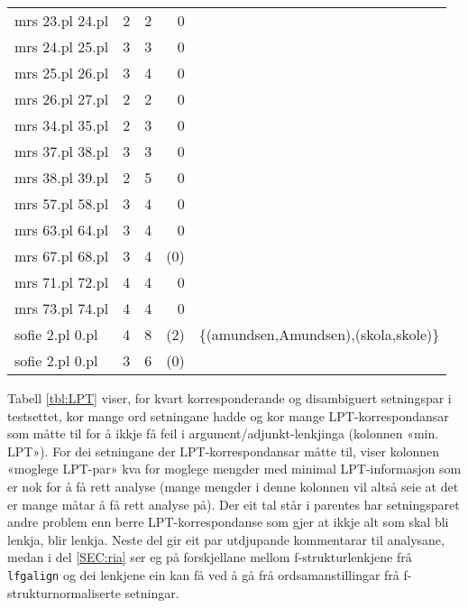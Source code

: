 \documentclass[11pt,a4paper,oneside,draft]{report}
\begin{document}
\begin{table}[htb]
\begin{center}
\begin{tabular}{lrrrl}
 mrs 23.pl 24.pl  &      2  &      2  &         0  &                                                \\
 mrs 24.pl 25.pl  &      3  &      3  &         0  &                                                \\
 mrs 25.pl 26.pl  &      3  &      4  &         0  &                                                \\
 mrs 26.pl 27.pl  &      2  &      2  &         0  &                                                \\
 mrs 34.pl 35.pl  &      2  &      3  &         0  &                                                \\
 mrs 37.pl 38.pl  &      3  &      3  &         0  &                                                \\
 mrs 38.pl 39.pl  &      2  &      5  &         0  &                                                \\
 mrs 57.pl 58.pl  &      3  &      4  &         0  &                                                \\
 mrs 63.pl 64.pl  &      3  &      4  &         0  &                                                \\
 mrs 67.pl 68.pl  &      3  &      4  &       (0)  &                                                \\
 mrs 71.pl 72.pl  &      4  &      4  &         0  &                                                \\
 mrs 73.pl 74.pl  &      4  &      4  &         0  &                                                \\
 sofie 2.pl 0.pl  &      4  &      8  &       (2)  &  \{(amundsen,Amundsen),(skola,skole)\}         \\
 sofie 2.pl 0.pl  &      3  &      6  &       (0)  &                                                \\
\end{tabular}
\end{center}
\end{table}


Tabell \ref{tbl:LPT} viser, for kvart korresponderande og disambiguert
setningspar i testsettet, kor mange ord setningane hadde og kor mange
LPT-korrespondansar som måtte til for å ikkje få feil i
argument/adjunkt-lenkjinga (kolonnen «min. LPT»). For dei setningane
der LPT-korrespondansar måtte til, viser kolonnen «moglege LPT-par»
kva for moglege mengder med minimal LPT-informasjon som er nok for å
få rett analyse (mange mengder i denne kolonnen vil altså seie at det
er mange måtar å få rett analyse på).  Der eit tal står i parentes har
setningsparet andre problem enn berre LPT-korrespondanse som gjer at
ikkje alt som skal bli lenkja, blir lenkja. Neste del gir eit par
utdjupande kommentarar til analysane, medan i del \ref{SEC:ria} ser eg
på forskjellane mellom f-strukturlenkjene frå \texttt{lfgalign} og dei
lenkjene ein kan få ved å gå frå ordsamanstillingar frå
f-strukturnormaliserte setningar.
\end{document}
